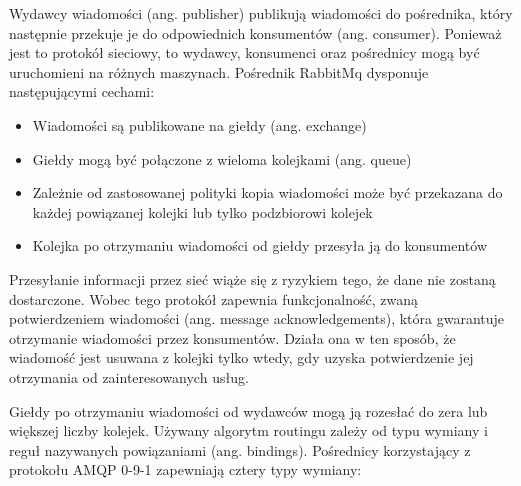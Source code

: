 \documentclass[11pt, a4]{article} %
\begin{document}
Wydawcy wiadomości (ang. publisher) publikują wiadomości do pośrednika, który następnie 
przekuje je do odpowiednich konsumentów (ang. consumer). Ponieważ jest to protokół 
sieciowy, to wydawcy, konsumenci oraz pośrednicy mogą być uruchomieni na różnych 
maszynach. Pośrednik RabbitMq dysponuje następującymi cechami:

\begin{itemize} %
    \item Wiadomości są publikowane na giełdy (ang. exchange)
    \item Giełdy mogą być połączone z wieloma kolejkami (ang. queue)
    \item Zależnie od zastosowanej polityki kopia wiadomości może być przekazana do 
    każdej powiązanej kolejki lub tylko podzbiorowi kolejek
    \item Kolejka po otrzymaniu wiadomości od giełdy przesyła ją do konsumentów
\end{itemize}

Przesyłanie informacji przez sieć wiąże się z ryzykiem tego, że dane nie zostaną 
dostarczone. Wobec tego protokół zapewnia funkcjonalność, zwaną potwierdzeniem 
wiadomości (ang. message acknowledgements), która gwarantuje otrzymanie wiadomości 
przez konsumentów. Działa ona w ten sposób, że wiadomość jest usuwana z kolejki tylko 
wtedy, gdy uzyska potwierdzenie jej otrzymania od zainteresowanych usług.

Giełdy po otrzymaniu wiadomości od wydawców mogą ją rozesłać do zera lub większej 
liczby kolejek. Używany algorytm routingu zależy od typu wymiany i reguł nazywanych 
powiązaniami (ang. bindings). Pośrednicy korzystający z protokołu AMQP 0-9-1 zapewniają 
cztery typy wymiany:
\end{document}
